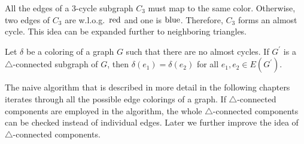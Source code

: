 All the edges of a 3-cycle subgraph \( C_3 \) must map to the same color.
Otherwise, two edges of \( C_3 \) are w.l.o.g.\ \( \text{red} \) and one is \( \text{blue} \).
Therefore, \( C_3 \) forms an almost cycle.
This idea can be expanded further to neighboring triangles.
%
%
\begin{lemma}
	Let \( \delta \) be a coloring of a graph \( G \) such that there are
	no almost cycles. If \( G^\prime \) is
	a \( \triangle \)-connected subgraph of \( G \),
	then \( \delta(e_1) = \delta(e_2) \) for all \( e_1, e_2 \in E(G^\prime) \).
\end{lemma}
%
The naive algorithm that is described in more detail in the following chapters
iterates through all the possible edge colorings of a graph.
If \( \triangle \)-connected components are employed in the algorithm,
the whole \( \triangle \)-connected components can be checked instead of individual edges.
Later we further improve the idea of \( \triangle \)-connected components.

